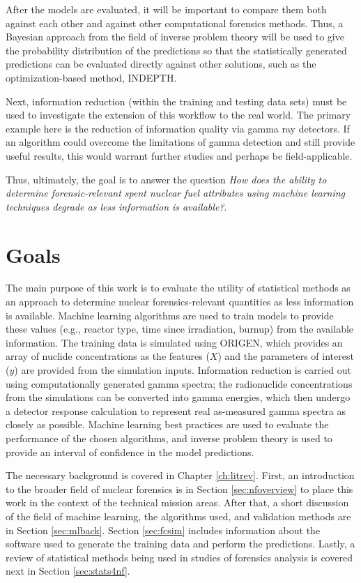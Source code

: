 After the models are evaluated, it will be important to compare them both
against each other and against other computational forensics methods. Thus, a
Bayesian approach from the field of inverse problem theory will be used to give
the probability distribution of the predictions so that the statistically
generated predictions can be evaluated directly against other solutions, such
as the optimization-based method, \gls{INDEPTH}. 

Next, information reduction (within the training and testing data sets) must be
used to investigate the extension of this workflow to the real world. The
primary example here is the reduction of information quality via gamma ray
detectors.  If an algorithm could overcome the limitations of gamma detection
and still provide useful results, this would warrant further studies and
perhaps be field-applicable.

Thus, ultimately, the goal is to answer the question \textit{How does the
ability to determine forensic-relevant spent nuclear fuel attributes using
machine learning techniques degrade as less information is available?}. 

\section{Goals}

The main purpose of this work is to evaluate the utility of statistical methods
as an approach to determine nuclear forensics-relevant quantities as less
information is available. Machine learning algorithms are used to train models
to provide these values (e.g., reactor type, time since irradiation, burnup)
from the available information. The training data is simulated using
\gls{ORIGEN}, which provides an array of nuclide concentrations as the features
($X$) and the parameters of interest ($y$) are provided from the simulation
inputs.  Information reduction is carried out using computationally generated
gamma spectra; the radionuclide concentrations from the simulations can be
converted into gamma energies, which then undergo a detector response
calculation to represent real as-measured gamma spectra as closely as possible.
Machine learning best practices are used to evaluate the performance of the
chosen algorithms, and inverse problem theory is used to provide an interval of
confidence in the model predictions.

The necessary background is covered in Chapter \ref{ch:litrev}.  First, an
introduction to the broader field of nuclear forensics is in Section
\ref{sec:nfoverview} to place this work in the context of the technical mission
areas. After that, a short discussion of the field of machine learning, the
algorithms used, and validation methods are in Section \ref{sec:mlback}.
Section \ref{sec:fcsim} includes information about the software used to generate
the training data and perform the predictions. Lastly, a review of statistical
methods being used in studies of forensics analysis is covered next in Section
\ref{sec:stats4nf}. 

